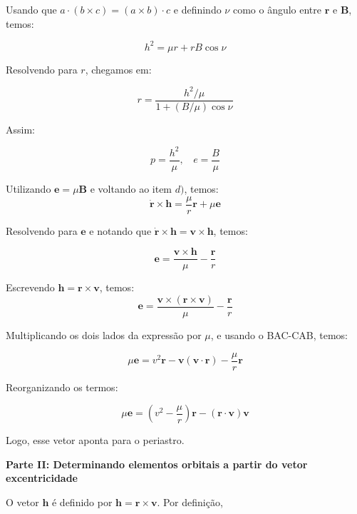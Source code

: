 \documentclass[11pt]{article}
\begin{document}
\begin{pproblem}
\begin{pssolution*}{}{}
\begin{alternativas}
            Usando que \(a\cdot(b\times c) = (a\times b)\cdot c\) e definindo \(\nu\) como o ângulo entre \(\mathbf{r}\) e \(\mathbf{B}\), temos:

            \[h^2 = \mu r + rB\cos\nu\]

            Resolvendo para \(r\), chegamos em:

            \[r = \frac{h^2/\mu}{1+(B/\mu)\cos\nu}\]

            Assim:

            \[\boxed{p = \frac{h^2}{\mu}, \ \ \ \ e = \frac{B}{\mu}}\]

            \item Utilizando \(\mathbf{e} = \mu \mathbf{B}\) e voltando ao item \(d)\), temos:
            \[\dot{\mathbf{r}}\times \mathbf{h} = \frac{\mu}{r}\mathbf{r}+\mu \mathbf{e}\]

            Resolvendo para \(\mathbf{e}\) e notando que \(\dot{\mathbf{r}}\times\mathbf{h} = \mathbf{v}\times\mathbf{h}\), temos:

            \[\boxed{\mathbf{e} = \frac{\mathbf{v}\times\mathbf{h}}{\mu} - \frac{\mathbf{r}}{r}}\]

            \item Escrevendo \(\mathbf{h} = \mathbf{r}\times\mathbf{v}\), temos:
            \[\mathbf{e} = \frac{\mathbf{v}\times(\mathbf{r}\times\mathbf{v})}{\mu} - \frac{\mathbf{r}}{r} \]

            Multiplicando os dois lados da expressão por \(\mu\), e usando o BAC-CAB, temos:

            \[\mu\mathbf{e} = v^2\mathbf{r} - \mathbf{v}(\mathbf{v}\cdot\mathbf{r}) - \frac{\mu}{r}\mathbf{r}\]

            Reorganizando os termos:

            \[\boxed{\mu \mathbf{e} = (v^2-\frac{\mu}{r})\mathbf{r} - (\mathbf{r}\cdot\mathbf{v})\mathbf{v}}\]

            Logo, esse vetor aponta para o periastro.
        \end{alternativas}
        \begin{center}
            \textbf{Parte II: Determinando elementos orbitais a partir do vetor excentricidade}     
        \end{center}
        \begin{alternativas}
            \item O vetor $\mathbf{h}$ é definido por $\mathbf{h} = \mathbf{r}\times\mathbf{v}$. Por definição,
            

\end{alternativas}
\end{pssolution*}
\end{pproblem}
\end{document}
